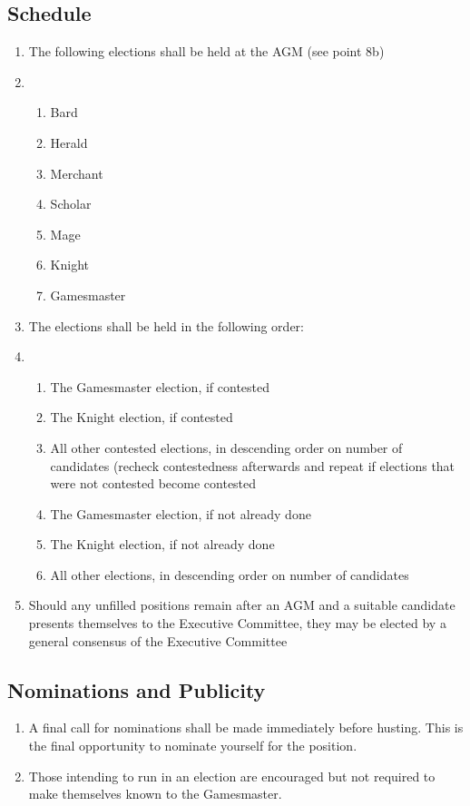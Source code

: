 \documentclass[hidelinks, 12pt, a4paper]{article}
\begin{document}
\subsection{Schedule}
\begin{enumerate}
	\item The following elections shall be held at the AGM (see point 8b)
	\item \begin{enumerate}
		\item Bard
		\item Herald
		\item Merchant
		\item Scholar
		\item Mage
		\item Knight
		\item Gamesmaster
	\end{enumerate}
	\item The elections shall be held in the following order:
	\item \begin{enumerate}
		\item The Gamesmaster election, if contested
		\item The Knight election, if contested
		\item All other contested elections, in descending order on number of candidates (recheck contestedness afterwards and repeat if elections that were not contested become contested
		\item The Gamesmaster election, if not already done
		\item The Knight election, if not already done
		\item All other elections, in descending order on number of candidates
	\end{enumerate}
	\item Should any unfilled positions remain after an AGM and a suitable candidate presents themselves to the Executive Committee, they may be elected by a general consensus of the Executive Committee
\end{enumerate}

\subsection{Nominations and Publicity}
\begin{enumerate}
	\item A final call for nominations shall be made immediately before husting. This is the final opportunity to nominate yourself for the position.
	\item Those intending to run in an election are encouraged but not required to make themselves known to the Gamesmaster. 
\end{enumerate}
\end{document}
